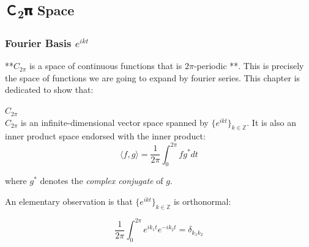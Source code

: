 \subsection{Ｃ\textsubscript{2}𝛑 Space}

%
\providecommand{\argmin}{\operatorname*{arg\,min}}%
\providecommand{\argmax}{\operatorname*{arg\,max}}%
\subsubsection{Fourier Basis $e^{ikt}$}

**$C_{2\pi}$  is a space of  continuous functions that is $2\pi$-periodic **. This is precisely the space of functions we are going to expand by fourier series. This chapter is dedicated to show that:

\begin{theorem}\textbf{$C_{2\pi}$}\\
$C_{2\pi}$ is an infinite-dimensional vector space spanned by $\{e^{ikt}\}_{k\in\mathbb{Z}}$. It is also an inner product space endorsed with the inner product:
\begin{equation}
\langle f,g \rangle = \frac{1}{2\pi}\int_{0}^{2\pi} fg^*dt
\end{equation}

\end{theorem}where $g^*$ denotes the \textit{complex conjugate} of $g$.

An elementary observation is that  $\{e^{ikt}\}_{k\in\mathbb{Z}}$ is orthonormal:

\begin{equation}
\frac{1}{2\pi}\int_0^{2\pi}e^{ik_1t}e^{-ik_2t}=\delta_{k_1k_2}
\end{equation}

